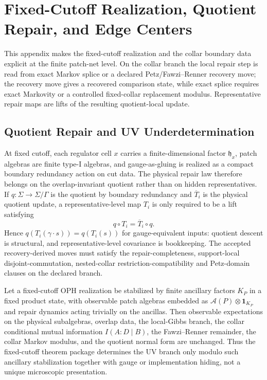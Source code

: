 \section{Fixed-Cutoff Realization, Quotient Repair, and Edge Centers}
\label{app:consensus-fixed-cutoff-port}

This appendix makes the fixed-cutoff realization and the collar boundary
data explicit at the finite patch-net level. On the collar branch the local
repair step is read from exact Markov splice or a declared
Petz/Fawzi--Renner recovery move; the recovery move gives a recovered
comparison state, while exact splice requires exact Markovity or a
controlled fixed-collar replacement modulus. Representative repair maps are
lifts of the resulting quotient-local update.

\subsection{Quotient Repair and UV Underdetermination}

At fixed cutoff, each regulator cell \(x\) carries a finite-dimensional factor
\(\mathfrak h_x\), patch algebras are finite type-I algebras, and gauge-as-gluing is realized as
a compact boundary redundancy action on cut data. The physical repair law therefore belongs on the
overlap-invariant quotient rather than on hidden representatives. If \(q:\Sigma\to\Sigma/\Gamma\)
is the quotient by boundary redundancy and \(\overline T_i\) is the physical quotient update, a
representative-level map \(T_i\) is only required to be a lift satisfying
\[
q\circ T_i=\overline T_i\circ q.
\]
Hence \(q(T_i(\gamma\cdot s))=q(T_i(s))\) for gauge-equivalent inputs:
quotient descent is structural, and representative-level covariance is
bookkeeping. The accepted recovery-derived moves must satisfy the
repair-completeness, support-local disjoint-commutation, nested-collar
restriction-compatibility and Petz-domain clauses on the declared branch.

\begin{proposition}
Let a fixed-cutoff OPH realization be stabilized by finite ancillary factors \(K_P\) in a fixed
product state, with observable patch algebras embedded as
\(\mathcal A(P)\otimes \mathbf 1_{K_P}\) and repair dynamics acting trivially on the ancillas.
Then observable expectations on the physical subalgebras, overlap data, the local-Gibbs branch,
the collar conditional mutual information \(I(A:D\mid B)\), the Fawzi--Renner remainder, the
collar Markov modulus, and the quotient normal form are unchanged. Thus the fixed-cutoff theorem
package determines the UV branch only modulo such ancillary stabilization together with gauge or
implementation hiding, not a unique microscopic presentation.
\end{proposition}

